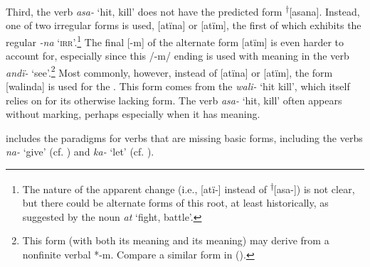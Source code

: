   Third, the verb \textit{asa-} ‘hit, kill’ does not have the predicted  form \textsuperscript{†}[asana]. Instead, one of two irregular forms is used, [atïna] or [atïm], the first of which exhibits the regular   \textit{{}-na} ‘\textsc{irr}’.\footnote{The nature of the apparent  change (i.e., [atï-] instead of \textsuperscript{†}[asa-]) is not clear, but there could be alternate forms of this root, at least historically, as suggested by the noun \textit{at} ‘fight, battle’.} The final [-m] of the alternate  form [atïm] is even harder to account for, especially since this /-m/ ending is used with  meaning in the verb \textit{andï-} ‘see’.\footnote{This form (with both its  meaning and its  meaning) may derive from a nonfinite verbal  *-m. Compare a similar form in  (\citealt[61--62]{Barlow2020b}).} Most commonly, however, instead of [atïna] or [atïm], the  form [walinda] is used for the  . This form comes from the  \textit{wali-} ‘hit kill’, which itself relies on  for its otherwise lacking  form. The verb \textit{asa-} ‘hit, kill’ often appears without  marking, perhaps especially when it has  meaning.



   includes the paradigms for verbs that are missing basic forms, including the verbs \textit{na-} ‘give’ (cf. ) and \textit{ka-} ‘let’ (cf. ).


